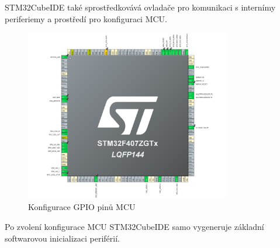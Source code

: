 STM32CubeIDE také sprostředkovává ovladače pro komunikaci s internímy periferiemy a prostředí pro konfiguraci MCU.
\begin{figure}[H]
    \caption{Konfigurace GPIO pinů MCU}
    \includegraphics[width=0.8\textwidth]{pictures/mcu_settings.jpg}
\end{figure}
Po zvolení konfigurace MCU STM32CubeIDE samo vygeneruje základní softwarovou inicializaci periférií.
